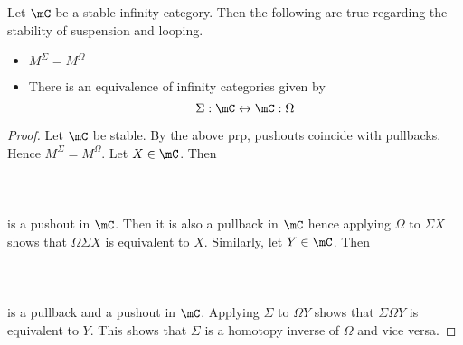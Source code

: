\documentclass[a4paper]{article}
\begin{document}
\begin{prp}{}{} Let $\mC$ be a stable infinity category. Then the following are true regarding the stability of suspension and looping. 
\begin{itemize}
\item $M^\Sigma=M^\Omega$
\item There is an equivalence of infinity categories given by $$\Sigma:\mC\leftrightarrow\mC:\Omega$$
\end{itemize} \tcbline
\begin{proof}
Let $\mC$ be stable. By the above prp, pushouts coincide with pullbacks. Hence $M^\Sigma=M^\Omega$. Let $X\in\mC$. Then \\~\\
\\~\\
is a pushout in $\mC$. Then it is also a pullback in $\mC$ hence applying $\Omega$ to $\Sigma X$ shows that $\Omega\Sigma X$ is equivalent to $X$. Similarly, let $Y\in\mC$. Then \\~\\
\\~\\
is a pullback and a pushout in $\mC$. Applying $\Sigma$ to $\Omega Y$ shows that $\Sigma\Omega Y$ is equivalent to $Y$. This shows that $\Sigma$ is a homotopy inverse of $\Omega$ and vice versa. 
\end{proof}
\end{prp}
\end{document}
